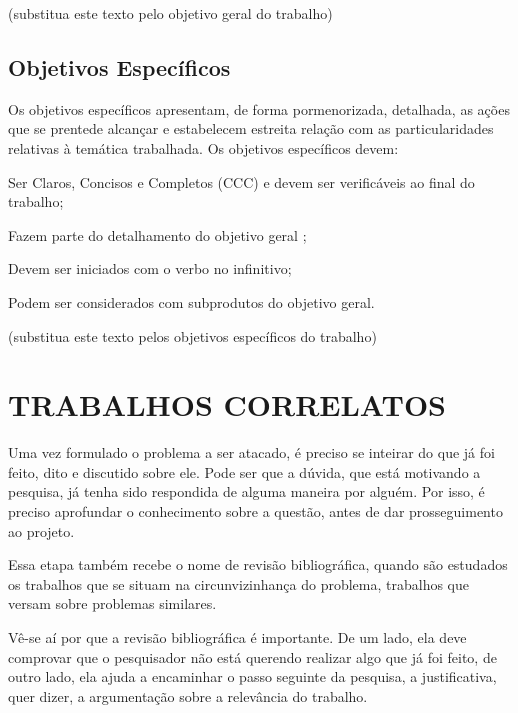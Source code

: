 (substitua este texto pelo objetivo geral do trabalho)

\subsection{Objetivos Específicos}
\label{subsec:objespc}
Os objetivos específicos apresentam, de forma pormenorizada, detalhada, as ações que se prentede alcançar e estabelecem estreita relação com as particularidades relativas à temática trabalhada. Os objetivos específicos devem:

Ser Claros, Concisos e Completos (CCC) e devem ser verificáveis ao final do trabalho;

Fazem parte do detalhamento do objetivo geral ;

Devem ser iniciados com o verbo no infinitivo;

Podem ser considerados com subprodutos do objetivo geral.

(substitua este texto pelos objetivos específicos do trabalho)

\section{TRABALHOS CORRELATOS}
\label{sec:estadoarte}
Uma vez formulado o problema a ser atacado, é preciso se inteirar do que já foi feito, dito e discutido sobre ele. Pode ser que a dúvida, que está motivando a pesquisa, já tenha sido respondida de alguma maneira por alguém. Por isso, é preciso aprofundar o conhecimento sobre a questão, antes de dar prosseguimento ao projeto.

Essa etapa também recebe o nome de revisão bibliográfica, quando são estudados os trabalhos que se situam na circunvizinhança do problema, trabalhos que versam sobre problemas similares.

Vê-se aí por que a revisão bibliográfica é importante. De um lado, ela deve comprovar que o pesquisador não está querendo realizar algo que já foi feito, de outro lado, ela ajuda a encaminhar o passo seguinte da pesquisa, a justificativa, quer dizer, a argumentação sobre a relevância do trabalho.

